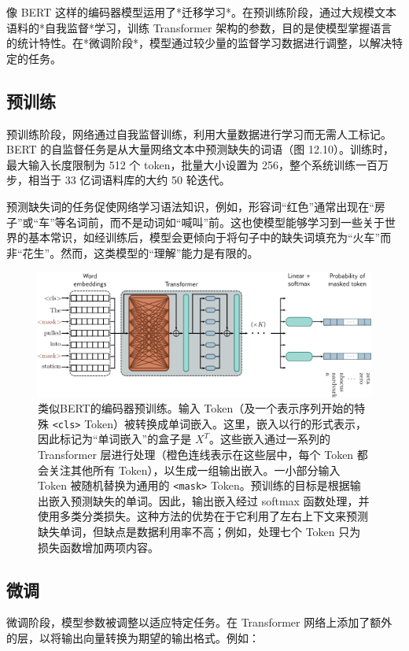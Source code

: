 像 BERT 这样的编码器模型运用了*迁移学习*。在预训练阶段，通过大规模文本语料的*自我监督*学习，训练 Transformer 架构的参数，目的是使模型掌握语言的统计特性。在*微调阶段*，模型通过较少量的监督学习数据进行调整，以解决特定的任务。

\subsection{预训练}
预训练阶段，网络通过自我监督训练，利用大量数据进行学习而无需人工标记。BERT 的自监督任务是从大量网络文本中预测缺失的词语（图 12.10）。训练时，最大输入长度限制为 512 个 token，批量大小设置为 256，整个系统训练一百万步，相当于 33 亿词语料库的大约 50 轮迭代。

预测缺失词的任务促使网络学习语法知识，例如，形容词“红色”通常出现在“房子”或“车”等名词前，而不是动词如“喊叫”前。这也使模型能够学习到一些关于世界的基本常识，如经训练后，模型会更倾向于将句子中的缺失词填充为“火车”而非“花生”。然而，这类模型的“理解”能力是有限的。

\begin{figure}[ht!]
\centering
\includegraphics[width=0.7\linewidth]{png/chapter12/TransformerEncoder.png}
\caption{类似BERT的编码器预训练。输入 Token（及一个表示序列开始的特殊 \texttt{\textless cls\textgreater} Token）被转换成单词嵌入。这里，嵌入以行的形式表示，因此标记为“单词嵌入”的盒子是 $X^T$。这些嵌入通过一系列的 Transformer 层进行处理（橙色连线表示在这些层中，每个 Token 都会关注其他所有 Token），以生成一组输出嵌入。一小部分输入 Token 被随机替换为通用的 \texttt{\textless mask\textgreater} Token。预训练的目标是根据输出嵌入预测缺失的单词。因此，输出嵌入经过 softmax 函数处理，并使用多类分类损失。这种方法的优势在于它利用了左右上下文来预测缺失单词，但缺点是数据利用率不高；例如，处理七个 Token 只为损失函数增加两项内容。}
\end{figure}


\subsection{微调}

微调阶段，模型参数被调整以适应特定任务。在 Transformer 网络上添加了额外的层，以将输出向量转换为期望的输出格式。例如：

